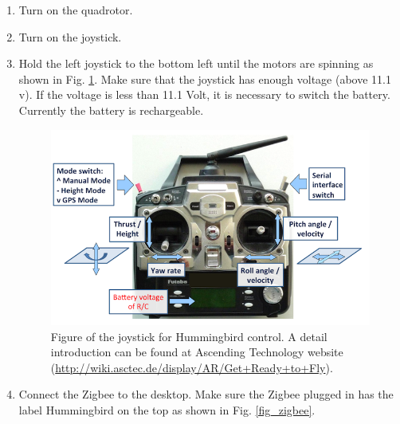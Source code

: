 \documentclass[idxtotoc,hyperref,openany]{labbook} %
\begin{document}
\begin{enumerate}
\item Turn on the quadrotor.
\item Turn on the joystick.
\item Hold the left joystick to the bottom left until the motors are spinning as shown in Fig. \ref{fig_joystick}. Make sure that the joystick has enough voltage (above 11.1 v). If the voltage is less than 11.1 Volt, it is necessary to switch the battery. Currently the battery is rechargeable. 

\begin{figure}[h!]
\centering
\includegraphics[scale=0.3]{./Figure/fig_joystick}
\caption{Figure of the joystick for Hummingbird control. A detail introduction can be found at Ascending Technology website (\url{http://wiki.asctec.de/display/AR/Get+Ready+to+Fly}).}\label{fig_joystick}
\end{figure}
\item Connect the Zigbee to the desktop. Make sure the Zigbee plugged in has the label Hummingbird on the top as shown in Fig. \ref{fig_zigbee}.
\begin{figure}[h!]
\centering

\end{figure}
\end{enumerate}
\end{document}

